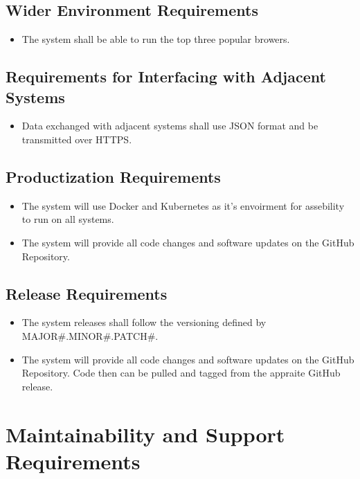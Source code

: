 \documentclass[12pt]{article}
\begin{document}
\subsection{Wider Environment Requirements}

\begin{itemize}
    \item The system shall be able to run the top three popular browers.
\end{itemize}


\subsection{Requirements for Interfacing with Adjacent Systems}

\begin{itemize}
    \item Data exchanged with adjacent systems shall use JSON format and be transmitted over HTTPS.
\end{itemize}

\subsection{Productization Requirements}
\begin{itemize}
    \item The system will use Docker and Kubernetes as it's envoirment for assebility to run on all systems.
    \item The system will provide all code changes and software updates on the GitHub Repository. 
\end{itemize}

\subsection{Release Requirements}
\begin{itemize}
    \item The system releases shall follow the versioning defined by MAJOR\#.MINOR\#.PATCH\#.
    \item The system will provide all code changes and software updates on the GitHub Repository. Code then can be pulled and tagged from the appraite GitHub release.
\end{itemize}


\section{Maintainability and Support Requirements}
\end{document}
